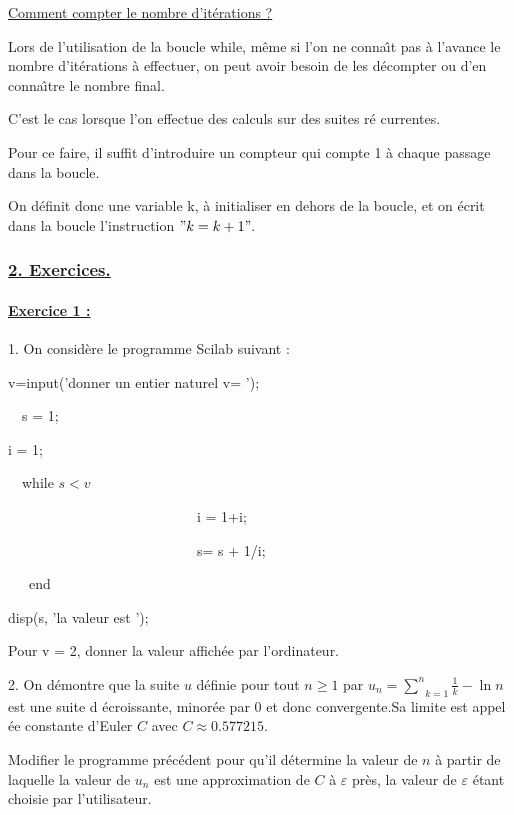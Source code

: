\documentclass{article}
\begin{document}
\underline{Comment compter le nombre d'it\'{e}rations ?}

Lors de l'utilisation de la boucle while, m\^{e}me si l'on ne conna\^{\i}t
pas \`{a} l'avance le nombre d'it\'{e}rations \`{a} effectuer, on peut avoir
besoin de les d\'{e}compter ou d'en conna\^{\i}tre le nombre final.

C'est le cas lorsque l'on effectue des calculs sur des suites r\'{e}%
currentes.

Pour ce faire, il suffit d'introduire un compteur qui compte 1 \`{a} chaque
passage dans la boucle.

On d\'{e}finit donc une variable k, \`{a} initialiser en dehors de la
boucle, et on \'{e}crit dans la boucle l'instruction $"k=k+1".$

\subsubsection{\protect\underline{2. Exercices.}}

\paragraph{\protect\underline{Exercice 1 :}}

1. On consid\`{e}re le programme Scilab suivant :

v=input('donner un entier naturel v= ');

\ \ s = 1;

i = 1;

\ \ while $s<v$

\ \ \ \ \ \ \ \ \ \ \ \ \ \ \ \ \ \ \ \ \ \ \ \ \ \ \ i = 1+i;

\ \ \ \ \ \ \ \ \ \ \ \ \ \ \ \ \ \ \ \ \ \ \ \ \ \ \ s= s + 1/i;

\ \ \ end

disp(s, 'la valeur est ');

Pour v = 2, donner la valeur affich\'{e}e par l'ordinateur.

2. On d\'{e}montre que la suite $u$ d\'{e}finie pour tout $n\geq 1$ par $%
u_{n}=\underset{k=1}{\overset{n}{\sum }}\frac{1}{k}-\ln n$ est une suite d%
\'{e}croissante, minor\'{e}e par 0 et donc convergente.Sa limite est appel%
\'{e}e constante d'Euler $C$ avec $C\approx 0.577215.$

Modifier le programme pr\'{e}c\'{e}dent pour qu'il d\'{e}termine la valeur
de $n$ \`{a} partir de laquelle la valeur de $u_{n}$ est une approximation
de $C$ \`{a} $\varepsilon $ pr\`{e}s, la valeur de $\varepsilon $ \'{e}tant
choisie par l'utilisateur.
\end{document}
